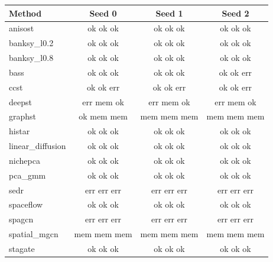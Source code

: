 \begin{tabular}{lccc}\toprule
Method & Seed 0 & Seed 1 & Seed 2 \\\midrule
anisost & ok ok ok & ok ok ok & ok ok ok \\
banksy\_l0.2 & ok ok ok & ok ok ok & ok ok ok \\
banksy\_l0.8 & ok ok ok & ok ok ok & ok ok ok \\
bass & ok ok ok & ok ok ok & ok ok err \\
ccst & ok ok err & ok ok err & ok ok err \\
deepst & err mem ok & err mem ok & err mem ok \\
graphst & ok mem mem & mem mem mem & mem mem mem \\
histar & ok ok ok & ok ok ok & ok ok ok \\
linear\_diffusion & ok ok ok & ok ok ok & ok ok ok \\
nichepca & ok ok ok & ok ok ok & ok ok ok \\
pca\_gmm & ok ok ok & ok ok ok & ok ok ok \\
sedr & err err err & err err err & err err err \\
spaceflow & ok ok ok & ok ok ok & ok ok ok \\
spagcn & err err err & err err err & err err err \\
spatial\_mgcn & mem mem mem & mem mem mem & mem mem mem \\
stagate & ok ok ok & ok ok ok & ok ok ok \\
\bottomrule\end{tabular}
